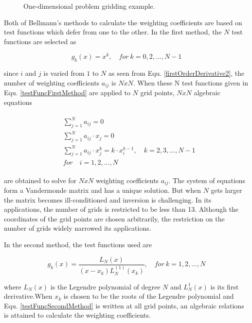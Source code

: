 \begin{figure}
\centerline{}
\vspace*{6mm}
\caption{One-dimensional problem gridding example.}
\label{oneDimGrid} 
\end{figure}

Both of Bellmann's methods to calculate the weighting coefficients are based on test functions which defer from one to the other. In the first method, the $N$ test functions are selected as

\begin{equation} \label{testFuncFirstMethod}
g_k(x)= x^k, \quad for \ k = 0,2, ...,N-1
\end{equation}

since $i$ and $j$ is varied from $1$ to $N$ as seen from Equ. \eqref{firstOrderDerivative2}, the number of weighting coefficients $a_{ij}$ is $NxN$. When these N test functions given in Equ. \eqref{testFuncFirstMethod} are applied to $N$ grid points, $NxN$ algebraic equations 

\begin{align}
\begin{split}
&\sum_{j=1}^N a_{ij} =0\\
&\sum_{j=1}^N a_{ij} \cdot x_j =0 \\
&\sum_{j=1}^N a_{ij} \cdot x_j^k = k \cdot x_i^{k-1}, \quad k = 2,3, ..., N-1 \\
&for \quad i = 1,2, ..., N
\end{split}
\end{align}

are obtained to solve for $NxN$ weighting coefficients $a_{ij}$. The system of equations form a Vandermonde matrix and has a unique solution. But when $N$ gets larger the matrix becomes ill-conditioned and inversion is challenging. In its applications, the number of grids is restricted to be less than 13. Although the coordinates of the grid points are chosen arbitrarily, the restriction on the number of grids widely narrowed its applications. 

In the second method, the test functions used are 

\begin{equation} \label{testFuncSecondMethod}
g_k(x)= \frac{L_N(x)}{(x-x_k)L_N^{(1)}(x_k)}, \quad for \ k = 1,2, ...,N
\end{equation}

where $L_N(x)$ is the Legendre polynomial of degree $N$ and $L_N^{1}(x)$ is its first derivative.When $x_k$ is chosen to be the roots of the Legendre polynomial and Equ. \eqref{testFuncSecondMethod} is written at all grid points, an algebraic relations is attained to calculate the weighting coefficients.

